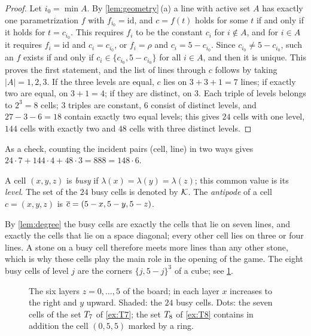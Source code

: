 \begin{proof}
Let $i_0=\min A$. By \cref{lem:geometry}\,(a) a line with active set $A$ has exactly one parametrization
$f$ with $f_{i_0}=\mathrm{id}$, and $c=f(t)$ holds for some $t$ if and only if it holds for $t=c_{i_0}$.
This requires $f_i$ to be the constant $c_i$ for $i\notin A$, and for $i\in A$ it requires
$f_i=\mathrm{id}$ and $c_i=c_{i_0}$, or $f_i=\rho$ and $c_i=5-c_{i_0}$. Since $c_{i_0}\ne 5-c_{i_0}$, such
an $f$ exists if and only if $c_i\in\{c_{i_0},5-c_{i_0}\}$ for all $i\in A$, and then it is unique. This
proves the first statement, and the list of lines through $c$ follows by taking $|A|=1,2,3$. If the three
levels are equal, $c$ lies on $3+3+1=7$ lines; if exactly two are equal, on $3+1=4$; if they are distinct,
on $3$. Each triple of levels belongs to $2^3=8$ cells; $3$ triples are constant, $6$ consist of distinct
levels, and $27-3-6=18$ contain exactly two equal levels; this gives $24$ cells with one level, $144$ cells
with exactly two and $48$ cells with three distinct levels.
\end{proof}

As a check, counting the incident pairs (cell, line) in two ways gives
$24\cdot 7+144\cdot 4+48\cdot 3=888=148\cdot 6$.

\begin{definition}\label{def:busy}
A cell $(x,y,z)$ is \emph{busy} if $\lambda(x)=\lambda(y)=\lambda(z)$; this common value is its \emph{level}.
The set of the $24$ busy cells is denoted by $\mathcal{K}$. The \emph{antipode} of a cell $c=(x,y,z)$ is
$\overline{c}=(5-x,5-y,5-z)$.
\end{definition}

By \cref{lem:degree} the busy cells are exactly the cells that lie on seven lines, and exactly the cells
that lie on a space diagonal; every other cell lies on three or four lines. A stone on a busy cell
therefore meets more lines than any other stone, which is why these cells play the main role in the
opening of the game. The eight busy cells of level $j$ are the corners $\{j,5-j\}^3$ of a cube; see
\cref{fig:busy}.

\begin{figure}[t]
\centering
{}
\caption{The six layers $z=0,\dots,5$ of the board; in each layer $x$ increases to the right and $y$
upward. Shaded: the $24$ busy cells. Dots: the seven cells of the set $T_7$ of \cref{ex:T7};
the set $T_8$ of \cref{ex:T8} contains in addition the cell $(0,5,5)$ marked by a ring.}
\label{fig:busy}
\end{figure}

